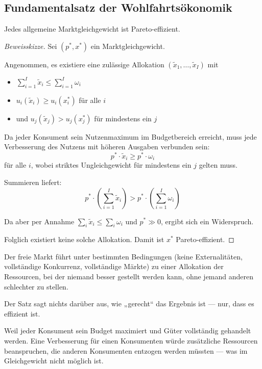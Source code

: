 \subsection{Fundamentalsatz der Wohlfahrtsökonomik}

\begin{theorem}
Jedes allgemeine Marktgleichgewicht ist Pareto-effizient.
\end{theorem}

\begin{proof}[Beweisskizze]
Sei \( (p^*, x^*) \) ein Marktgleichgewicht.

Angenommen, es existiere eine zulässige Allokation \( (\tilde{x}_1, \dots, \tilde{x}_I) \) mit
\begin{itemize}
    \item \( \sum_{i=1}^I \tilde{x}_i \leq \sum_{i=1}^I \omega_i \)
    \item \( u_i(\tilde{x}_i) \geq u_i(x_i^*) \) für alle \( i \)
    \item und \( u_j(\tilde{x}_j) > u_j(x_j^*) \) für mindestens ein \( j \)
\end{itemize}

Da jeder Konsument sein Nutzenmaximum im Budgetbereich erreicht, muss jede Verbesserung des Nutzens mit höheren Ausgaben verbunden sein:
\[
p^* \cdot \tilde{x}_i \geq p^* \cdot \omega_i
\]
für alle \( i \), wobei striktes Ungleichgewicht für mindestens ein \( j \) gelten muss.

Summieren liefert:
\[
p^* \cdot \left( \sum_{i=1}^I \tilde{x}_i \right) > p^* \cdot \left( \sum_{i=1}^I \omega_i \right)
\]

Da aber per Annahme \( \sum_i \tilde{x}_i \leq \sum_i \omega_i \) und \( p^* \gg 0 \), ergibt sich ein Widerspruch.

Folglich existiert keine solche Allokation.  
Damit ist \( x^* \) Pareto-effizient.
\end{proof}

Der freie Markt führt unter bestimmten Bedingungen (keine Externalitäten, vollständige Konkurrenz, vollständige Märkte) zu einer Allokation der Ressourcen, bei der niemand besser gestellt werden kann, ohne jemand anderen schlechter zu stellen.


\begin{remark}
Der Satz sagt nichts darüber aus, wie „gerecht“ das Ergebnis ist — nur, dass es effizient ist.
\end{remark}

\begin{fluff}[Intuition]
    Weil jeder Konsument sein Budget maximiert und Güter vollständig gehandelt werden. Eine Verbesserung für einen Konsumenten würde zusätzliche Ressourcen beanspruchen, die anderen Konsumenten entzogen werden müssten — was im Gleichgewicht nicht möglich ist.
\end{fluff}



